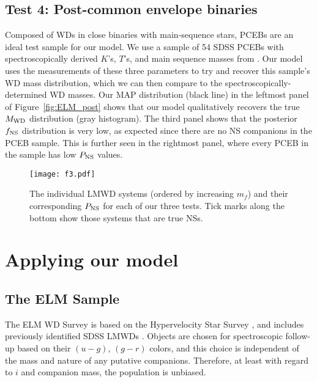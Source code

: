 \documentclass[apjl]{emulateapj}
\newcommand{\period}{T}
\newcommand{\mf}{m_f}
\begin{document}
\subsection{Test 4: Post-common envelope binaries} \label{sec:PCEB}
Composed of WDs in close binaries with main-sequence stars, PCEBs are an ideal test sample for our model. 
We use a sample of 54 SDSS PCEBs with spectroscopically derived $K$'s, $\period$'s, and main sequence masses from \citep{nebot11}. Our model uses the measurements of these three parameters to try and recover this sample's WD mass distribution, which we can then compare to the spectroscopically-determined WD masses. 
Our MAP distribution (black line) in the leftmost panel of Figure~\ref{fig:ELM_post} shows that our model qualitatively recovers the true $M_{\rm WD}$ distribution (gray histogram). The third panel shows that the posterior $f_{\rm NS}$ distribution is very low, as expected since there are no NS companions in the PCEB sample. This is further seen in the rightmost panel, where every PCEB in the sample has low $P_{\rm NS}$ values.

\begin{figure*}[h!]
\begin{center}
\texttt{[image: f3.pdf]}
\caption{ The individual LMWD systems (ordered by increasing $\mf$) and their corresponding $P_{\rm NS}$ for each of our three tests. Tick marks along the bottom show those systems that are true NSs.}
\label{fig:P_NS}
\end{center}
\end{figure*}

\section{Applying our model}
\subsection{The ELM Sample}
The ELM WD Survey is based on the Hypervelocity Star Survey \citep{brown06}, and includes previously identified SDSS LMWDs \citep{eisenstein06,liebert04}. Objects are chosen for spectroscopic follow-up based on their $(u-g)$, $(g-r)$ colors, and this choice is independent of the mass and nature of any putative companions. Therefore, at least with regard to $i$ and companion mass, the population is unbiased.
\end{document}
